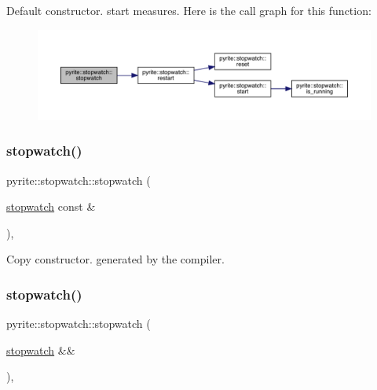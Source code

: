 Default constructor. start measures. Here is the call graph for this function\+:
\nopagebreak
\begin{figure}[H]
\begin{center}
\leavevmode
\includegraphics[width=350pt]{d6/dd1/classpyrite_1_1stopwatch_a685312010147a137543d0a65220153e6_cgraph}
\end{center}
\end{figure}
\mbox{\label{classpyrite_1_1stopwatch_a5a833844590a54c1027b572fbef8dcb6}} 
\subsubsection{\texorpdfstring{stopwatch()}{stopwatch()}\hspace{0.1cm}{\footnotesize\ttfamily [2/3]}}
{\footnotesize\ttfamily pyrite\+::stopwatch\+::stopwatch (\begin{DoxyParamCaption}\item[{\mbox{\hyperlink{classpyrite_1_1stopwatch}{stopwatch}} const \&}]{ }\end{DoxyParamCaption})\hspace{0.3cm}{\ttfamily [default]}, {\ttfamily [noexcept]}}

Copy constructor. generated by the compiler. \mbox{\label{classpyrite_1_1stopwatch_ab640070338c43dbde8c8d0471bd415d7}} 
\subsubsection{\texorpdfstring{stopwatch()}{stopwatch()}\hspace{0.1cm}{\footnotesize\ttfamily [3/3]}}
{\footnotesize\ttfamily pyrite\+::stopwatch\+::stopwatch (\begin{DoxyParamCaption}\item[{\mbox{\hyperlink{classpyrite_1_1stopwatch}{stopwatch}} \&\&}]{ }\end{DoxyParamCaption})\hspace{0.3cm}{\ttfamily [default]}, {\ttfamily [noexcept]}}

